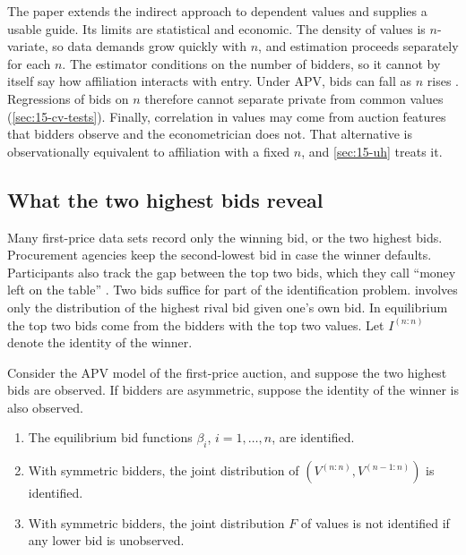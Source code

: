  The paper extends the indirect approach to dependent values and supplies a usable
guide. Its limits are statistical and economic. The density of values is $n$-variate, so data demands grow
quickly with $n$, and estimation proceeds separately for each $n$. The estimator conditions on the number of
bidders, so it cannot by itself say how affiliation interacts with entry. Under APV, bids can fall as $n$
rises \citep{PinkseTan2005}. Regressions of bids on $n$ therefore cannot separate private from common values
(\cref{sec:15-cv-tests}). Finally, correlation in values may come from auction features that bidders observe
and the econometrician does not. That alternative is observationally equivalent to affiliation with a fixed
$n$, and \cref{sec:15-uh} treats it.

\subsection{What the two highest bids reveal}\label{sec:15-apv-top2}

Many first-price data sets record only the winning bid, or the two highest bids. Procurement agencies keep
the second-lowest bid in case the winner defaults. Participants also track the gap between the top two
bids, which they call ``money left on the table'' \citep[p.~2123]{AtheyHaile2002}. Two bids suffice for
part of the identification problem.  involves only the distribution of the
highest rival bid given one's own bid. In equilibrium the top two bids come from the bidders with the top
two values. Let $I^{(n:n)}$ denote the identity of the winner.

\begin{proposition}\label{prop:15-top2}
Consider the APV model of the first-price auction, and suppose the two highest bids are observed. If
bidders are asymmetric, suppose the identity of the winner is also observed.
\begin{enumerate}[label=(\roman*)]
  \item The equilibrium bid functions $\beta_i$, $i=1,\dots,n$, are identified.
  \item With symmetric bidders, the joint distribution of $(V^{(n:n)},V^{(n-1:n)})$ is identified.
  \item With symmetric bidders, the joint distribution $F$ of values is not identified if any lower bid is
  unobserved.
\end{enumerate}
\end{proposition}

